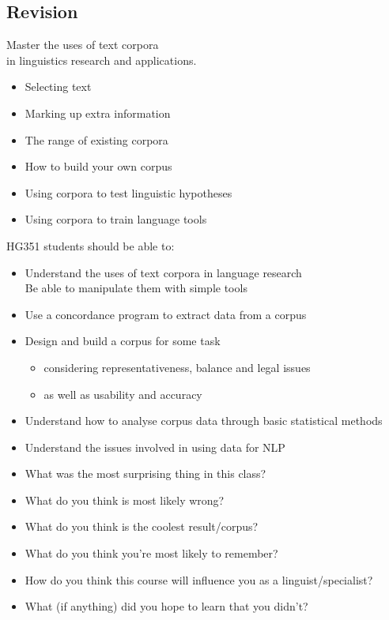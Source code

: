 \documentclass[a4paper,landscape,headrule,footrule,dvips]{foils}
\begin{document}
\begin{CJK}{UTF8}{min}
\section{Revision}
\MyLogo{}



\begin{center}
  \LARGE 
Master the uses of text corpora 
\\ in linguistics research and applications.
\end{center}
\begin{itemize}
\item Selecting text
\item Marking up extra information
\item The range of existing corpora
\item How to build your own corpus
\item Using corpora to test linguistic hypotheses
\item Using corpora to train language tools
\end{itemize}



HG351 students should be able to:

\begin{itemize}
\item Understand the uses of text corpora in language research
  \\ Be able to manipulate them with simple tools
\item Use a concordance program to extract data from a corpus
\item Design and build a corpus for some task
\begin{itemize}
\item considering representativeness, balance and legal issues
\item  as well as usability and accuracy
\end{itemize}
\item Understand how to analyse corpus data through basic statistical methods
\item Understand the issues involved in using data for NLP
\end{itemize}



\begin{itemize}
\item What was the most surprising thing in this class?
\item What do you think is most likely wrong?
\item What do you think is the coolest result/corpus?
\item What do you think you’re most likely to
remember?
\item How do you think this course will influence you as a linguist/specialist?
\item What (if anything) did you hope to learn that you didn't?
\end{itemize}



\clearpage
\end{CJK}
\end{document}
